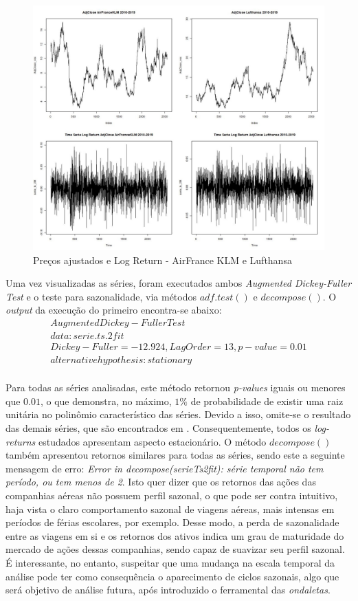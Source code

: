 \documentclass[12pt]{article}
\begin{document}
\begin{figure}[H]
	\centering
	\includegraphics[width=0.8\linewidth]{../Modelos/SeriesCompEuropa10_19}
	\caption{Preços ajustados e Log Return - AirFrance KLM e Lufthansa}
	\label{fig:seriescompeuropa1019}
\end{figure}

Uma vez visualizadas as séries, foram executados ambos \textit{Augmented Dickey-Fuller Test} e o teste para sazonalidade, via métodos $adf.test()$ e $decompose()$. O \textit{output} da execução do primeiro encontra-se abaixo:
\begin{gather*}
Augmented Dickey-Fuller Test\\
data:  serie.ts.2fit\\
Dickey-Fuller = -12.924, Lag Order = 13, p-value = 0.01\\
alternative hypothesis: stationary\\
\end{gather*}

Para todas as séries analisadas, este método retornou \emph{p-values} iguais ou menores que $0.01$, o que demonstra, no máximo, $1\%$ de probabilidade de existir uma raiz unitária no polinômio característico das séries. Devido a isso, omite-se o resultado das demais séries, que são encontrados em \cite{git}. Consequentemente, todos os \textit{log-returns} estudados apresentam aspecto estacionário. O método $decompose()$ também apresentou retornos similares para todas as séries, sendo este a seguinte mensagem de erro: \emph{Error in decompose(serieTs2fit): série temporal não tem período, ou tem menos de 2}. Isto quer dizer que os retornos das ações das companhias aéreas não possuem perfil sazonal, o que pode ser contra intuitivo, haja vista o claro comportamento sazonal de viagens aéreas, mais intensas em períodos de férias escolares, por exemplo. Desse modo, a perda de sazonalidade entre as viagens em si e os retornos dos ativos indica um grau de maturidade do mercado de ações dessas companhias, sendo capaz de suavizar seu perfil sazonal. É interessante, no entanto, suspeitar que uma mudança na escala temporal da análise pode ter como consequência o aparecimento de ciclos sazonais, algo que será objetivo de análise futura, após introduzido o ferramental das \emph{ondaletas}. 
\end{document}
